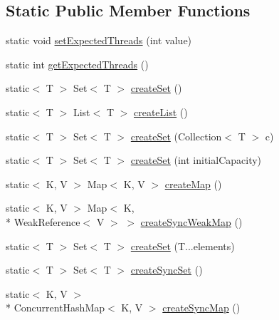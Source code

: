 \subsection*{Static Public Member Functions}
\begin{DoxyCompactItemize}
\item 
static void \hyperlink{classorg_1_1semanticweb_1_1owlapi_1_1util_1_1_collection_factory_a36ea8177a70e44f8ad4963f1b9e5923c}{set\-Expected\-Threads} (int value)
\item 
static int \hyperlink{classorg_1_1semanticweb_1_1owlapi_1_1util_1_1_collection_factory_adb2db56fc69a81c0c7251173469fb96f}{get\-Expected\-Threads} ()
\item 
static$<$ T $>$ Set$<$ T $>$ \hyperlink{classorg_1_1semanticweb_1_1owlapi_1_1util_1_1_collection_factory_a70c50a51ac48365f1d66a43cd7006738}{create\-Set} ()
\item 
static$<$ T $>$ List$<$ T $>$ \hyperlink{classorg_1_1semanticweb_1_1owlapi_1_1util_1_1_collection_factory_a001ca5edb1b405e71254a66d25890636}{create\-List} ()
\item 
static$<$ T $>$ Set$<$ T $>$ \hyperlink{classorg_1_1semanticweb_1_1owlapi_1_1util_1_1_collection_factory_ab545b7d14e7704a928854252f0e91da0}{create\-Set} (Collection$<$ T $>$ c)
\item 
static$<$ T $>$ Set$<$ T $>$ \hyperlink{classorg_1_1semanticweb_1_1owlapi_1_1util_1_1_collection_factory_a13bc8d48a7cd9e8aaa77b91d795b464c}{create\-Set} (int initial\-Capacity)
\item 
static$<$ K, V $>$ Map$<$ K, V $>$ \hyperlink{classorg_1_1semanticweb_1_1owlapi_1_1util_1_1_collection_factory_a96d5c9c5b22327a472e1876bc69220e8}{create\-Map} ()
\item 
static$<$ K, V $>$ Map$<$ K, \\*
Weak\-Reference$<$ V $>$ $>$ \hyperlink{classorg_1_1semanticweb_1_1owlapi_1_1util_1_1_collection_factory_a6b6bc74489ee6873dd8f9db32f6d7a20}{create\-Sync\-Weak\-Map} ()
\item 
static$<$ T $>$ Set$<$ T $>$ \hyperlink{classorg_1_1semanticweb_1_1owlapi_1_1util_1_1_collection_factory_a48a4d1a7a115b446a63bd9af0e5cfe0d}{create\-Set} (T...\-elements)
\item 
static$<$ T $>$ Set$<$ T $>$ \hyperlink{classorg_1_1semanticweb_1_1owlapi_1_1util_1_1_collection_factory_aadfa83df38d7340a233a9e6cd6172211}{create\-Sync\-Set} ()
\item 
static$<$ K, V $>$\\*
 Concurrent\-Hash\-Map$<$ K, V $>$ \hyperlink{classorg_1_1semanticweb_1_1owlapi_1_1util_1_1_collection_factory_ab60fbcc2a1ae25a8b62573dcec49cc10}{create\-Sync\-Map} ()

\end{DoxyCompactItemize}
